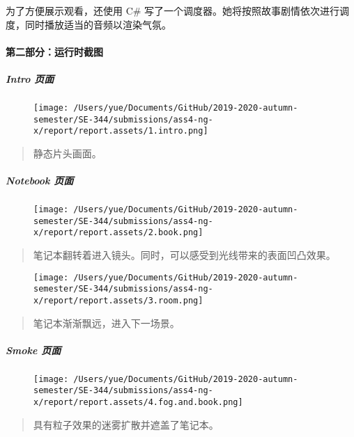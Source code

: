 \documentclass[
]{article}
\begin{document}
为了方便展示观看，还使用 C\#
写了一个调度器。她将按照故事剧情依次进行调度，同时播放适当的音频以渲染气氛。

\hypertarget{header-n19}{%
\paragraph{第二部分：运行时截图}\label{header-n19}}

\hypertarget{header-n20}{%
\subparagraph{Intro 页面}\label{header-n20}}

\begin{figure}
\centering
\texttt{[image: /Users/yue/Documents/GitHub/2019-2020-autumn-semester/SE-344/submissions/ass4-ng-x/report/report.assets/1.intro.png]}
\caption{}
\end{figure}

\begin{quote}
静态片头画面。
\end{quote}

\hypertarget{header-n24}{%
\subparagraph{Notebook 页面}\label{header-n24}}

\begin{figure}
\centering
\texttt{[image: /Users/yue/Documents/GitHub/2019-2020-autumn-semester/SE-344/submissions/ass4-ng-x/report/report.assets/2.book.png]}
\caption{}
\end{figure}

\begin{quote}
笔记本翻转着进入镜头。同时，可以感受到光线带来的表面凹凸效果。
\end{quote}

\begin{figure}
\centering
\texttt{[image: /Users/yue/Documents/GitHub/2019-2020-autumn-semester/SE-344/submissions/ass4-ng-x/report/report.assets/3.room.png]}
\caption{}
\end{figure}

\begin{quote}
笔记本渐渐飘远，进入下一场景。
\end{quote}

\hypertarget{header-n31}{%
\subparagraph{Smoke 页面}\label{header-n31}}

\begin{figure}
\centering
\texttt{[image: /Users/yue/Documents/GitHub/2019-2020-autumn-semester/SE-344/submissions/ass4-ng-x/report/report.assets/4.fog.and.book.png]}
\caption{}
\end{figure}

\begin{quote}
具有粒子效果的迷雾扩散并遮盖了笔记本。
\end{quote}
\end{document}
